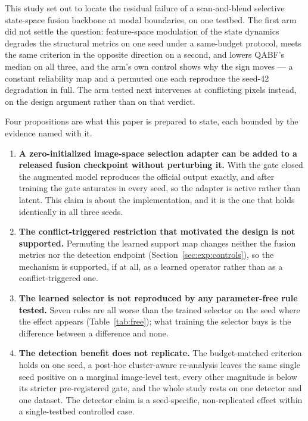 \documentclass[pdflatex,sn-mathphys-num]{sn-jnl}
\theoremstyle{thmstyleone}%
\theoremstyle{thmstyletwo}%
\theoremstyle{thmstylethree}%
\begin{document}
This study set out to locate the residual failure of a scan-and-blend selective state-space fusion backbone at modal boundaries, on one testbed. The first arm did not settle the question: feature-space modulation of the state dynamics degrades the structural metrics on one seed under a same-budget protocol, meets the same criterion in the opposite direction on a second, and lowers QABF's median on all three, and the arm's own control shows why the sign moves --- a constant reliability map and a permuted one each reproduce the seed-42 degradation in full. The arm tested next intervenes at conflicting pixels instead, on the design argument rather than on that verdict.

Four propositions are what this paper is prepared to state, each bounded by the evidence named with it.

\begin{enumerate}
\item \textbf{A zero-initialized image-space selection adapter can be added to a released fusion checkpoint without perturbing it.} With the gate closed the augmented model reproduces the official output exactly, and after training the gate saturates in every seed, so the adapter is active rather than latent. This claim is about the implementation, and it is the one that holds identically in all three seeds.
\item \textbf{The conflict-triggered restriction that motivated the design is not supported.} Permuting the learned support map changes neither the fusion metrics nor the detection endpoint (Section~\ref{sec:exp:controls}), so the mechanism is supported, if at all, as a learned operator rather than as a conflict-triggered one.
\item \textbf{The learned selector is not reproduced by any parameter-free rule tested.} Seven rules are all worse than the trained selector on the seed where the effect appears (Table~\ref{tab:free}); what training the selector buys is the difference between a difference and none.
\item \textbf{The detection benefit does not replicate.} The budget-matched criterion holds on one seed, a post-hoc cluster-aware re-analysis leaves the same single seed positive on a marginal image-level test, every other magnitude is below its stricter pre-registered gate, and the whole study rests on one detector and one dataset. The detector claim is a seed-specific, non-replicated effect within a single-testbed controlled case.
\end{enumerate}
\end{document}

